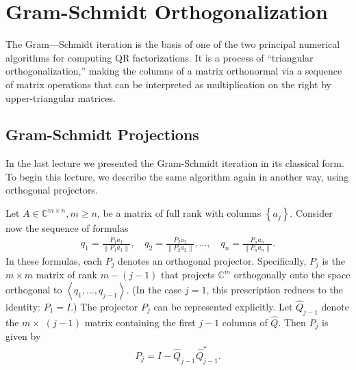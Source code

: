 \chapter{Gram-Schmidt Orthogonalization}
The Gram—Schmidt iteration is the basis of one of the two principal numerical algorithms for computing QR factorizations. It is a process of ``triangular orthogonalization,'' making the columns of a matrix orthonormal via a sequence of matrix operations that can be interpreted as multiplication on the right by upper-triangular matrices.

\section{Gram-Schmidt Projections}
In the last lecture we presented the Gram-Schmidt iteration in its classical form. To begin this lecture, we describe the same algorithm again in another way, using orthogonal projectors.

Let $A \in \mathbb{C}^{m \times n}, m \geq n$, be a matrix of full rank with columns $\left\{a_j\right\}$. Consider now the sequence of formulas
\begin{align*}
q_1=\frac{P_1 a_1}{\left\|P_1 a_1\right\|}, \quad q_2=\frac{P_2 a_2}{\left\|P_2 a_2\right\|}, \ldots, \quad q_n=\frac{P_n a_n}{\left\|P_n a_n\right\|} .
\end{align*}
In these formulas, each $P_j$ denotes an orthogonal projector. Specifically, $P_j$ is the $m \times m$ matrix of rank $m-(j-1)$ that projects $\mathbb{C}^m$ orthogonally onto the space orthogonal to $\left\langle q_1, \ldots, q_{j-1}\right\rangle$. (In the case $j=1$, this prescription reduces to the identity: $P_1=I$.) The projector $P_j$ can be represented explicitly. Let $\hat{Q}_{j-1}$ denote the $m \times$ $(j-1)$ matrix containing the first $j-1$ columns of $\hat{Q}$. Then $P_j$ is given by
\begin{align*}
P_j=I-\hat{Q}_{j-1} \hat{Q}_{j-1}^*.
\end{align*}


